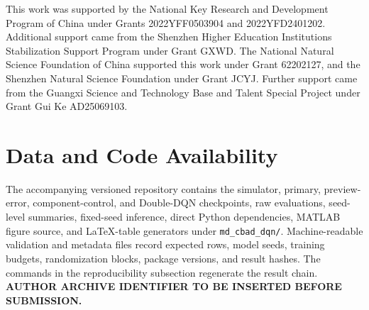\documentclass[11pt]{article}
\begin{document}
This work was supported by the National Key Research and Development Program of China under Grants 2022YFF0503904 and 2022YFD2401202. Additional support came from the Shenzhen Higher Education Institutions Stabilization Support Program under Grant GXWD. The National Natural Science Foundation of China supported this work under Grant 62202127, and the Shenzhen Natural Science Foundation under Grant JCYJ. Further support came from the Guangxi Science and Technology Base and Talent Special Project under Grant Gui Ke AD25069103.

\section*{Data and Code Availability}

{\color{red}%
The accompanying versioned repository contains the simulator, primary, preview-error, component-control, and Double-DQN checkpoints, raw evaluations, seed-level summaries, fixed-seed inference, direct Python dependencies, MATLAB figure source, and LaTeX-table generators under \texttt{md\_cbad\_dqn/}. Machine-readable validation and metadata files record expected rows, model seeds, training budgets, randomization blocks, package versions, and result hashes. The commands in the reproducibility subsection regenerate the result chain. \textbf{AUTHOR ARCHIVE IDENTIFIER TO BE INSERTED BEFORE SUBMISSION.}
}%

\begingroup
\small
\setlength{\itemsep}{0.2em}


\endgroup
\end{document}
